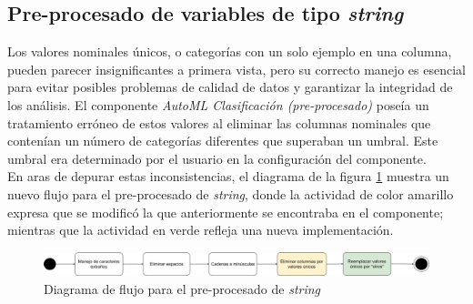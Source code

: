 \subsection{Pre-procesado de variables de tipo \textit{string}}
Los valores nominales únicos, o categorías con un solo ejemplo en una columna, pueden parecer insignificantes a primera vista, pero su correcto manejo es esencial para evitar posibles problemas de calidad de datos y garantizar la integridad de los análisis. El componente \textit{AutoML Clasificación (pre-procesado)} poseía un tratamiento erróneo de estos valores al eliminar las columnas nominales que contenían un número de categorías diferentes que superaban un umbral. Este umbral era determinado por el usuario en la configuración del componente. \\ 
En aras de depurar estas inconsistencias, el diagrama de la figura \ref{fig:string-preprocs} muestra un nuevo flujo para el pre-procesado de \textit{string}, donde la actividad de color amarillo expresa que se modificó la que anteriormente se encontraba en el componente; mientras que la actividad en verde refleja una nueva implementación.

\begin{figure}[H]
	\centering
	\includegraphics[width=0.95\linewidth]{"figuras/capi 2/preprocesado/string preprocs.drawio"}
	\caption{Diagrama de flujo para el pre-procesado de \textit{string}}
	\label{fig:string-preprocs}
\end{figure}

